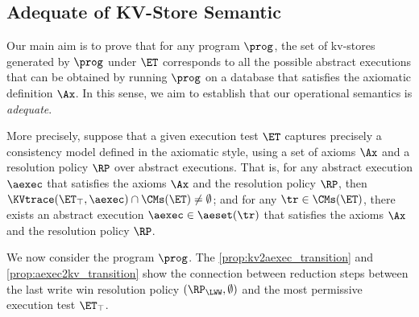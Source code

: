 \subsection{Adequate of KV-Store Semantic}

Our main aim is to prove that for any program $\prog$, 
the set of  kv-stores generated by $\prog$ under $\ET$ 
corresponds to all the possible abstract executions that 
can be obtained by running $\prog$ on a database that satisfies the axiomatic definition $\Ax$. 
In this sense, we aim to establish that our operational semantics is \emph{adequate}.

More precisely, suppose that a given execution test $\ET$ captures precisely 
a consistency model defined in the axiomatic style, using a set of 
axioms $\Ax$ and a resolution policy $\RP$ over abstract executions.
That is, for any abstract execution $\aexec$ that satisfies 
the axioms $\Ax$ and the resolution policy $\RP$, then $\KVtrace(\ET_{\top}, \aexec) \cap \CMs(\ET) \neq \emptyset$; 
and for any $\tr \in \CMs(\ET)$, there exists an abstract execution 
$\aexec \in \aeset(\tr)$ that satisfies the axioms $\Ax$ and the resolution policy $\RP$. 
%




We now consider the program \( \prog \).
The \cref{prop:kv2aexec_transition} and \cref{prop:aexec2kv_transition} show 
the connection between reduction steps between 
the last write win resolution policy \( (\RP_{\LWW}, \emptyset) \) 
and the most permissive execution test \( \ET_\top \).

